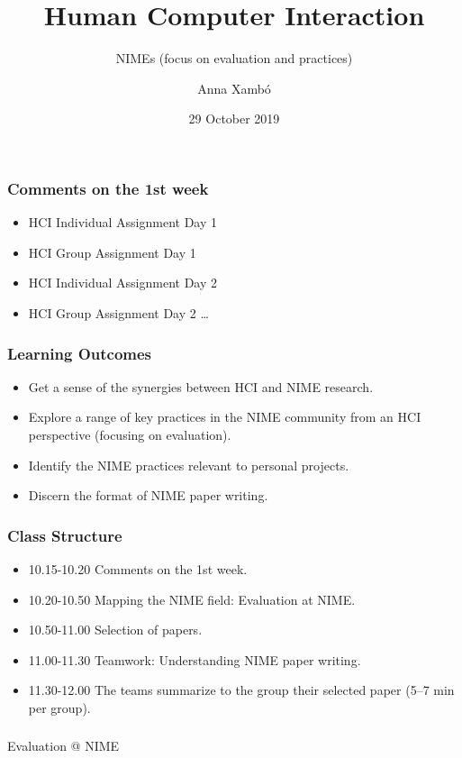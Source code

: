 \documentclass[screen, aspectratio=169]{beamer}
\title[HCI-intro]{Human Computer Interaction}
\subtitle{NIMEs (focus on evaluation and practices)}
\author[A. Xamb{\'o}]{Anna Xamb{\'o}}
\institute[NTNU]{Department of Music, NTNU}
\date{29 October 2019}
\begin{document}
\begin{frame}
  \titlepage
\end{frame}

\begin{frame}
\frametitle{Comments on the 1st week}
\begin{itemize}
\item HCI Individual Assignment Day 1
\item HCI Group Assignment Day 1
\item HCI Individual Assignment Day 2
\item HCI Group Assignment Day 2 \dots
\end{itemize}
\end{frame}
%
\begin{frame}
\frametitle{Learning Outcomes}
\begin{itemize}
\item Get a sense of the synergies between HCI and NIME research.
\item Explore a range of key practices in the NIME community from an HCI perspective (focusing on evaluation).
\item Identify the NIME practices relevant to personal projects.
\item Discern the format of NIME paper writing.
\end{itemize}
\end{frame}
%
\begin{frame}
\frametitle{Class Structure}
\begin{itemize}
\item 10.15-10.20 Comments on the 1st week.
\item 10.20-10.50 Mapping the NIME field: Evaluation at NIME.
\item 10.50-11.00 Selection of papers.
\item 11.00-11.30 Teamwork: Understanding NIME paper writing.
\item 11.30-12.00 The teams summarize to the group their selected paper (5--7 min per group). 
\end{itemize}
\end{frame}
%
\begin{frame}
\frametitle{}
\Huge{Evaluation @ NIME}
\end{frame}
%
\end{document}
